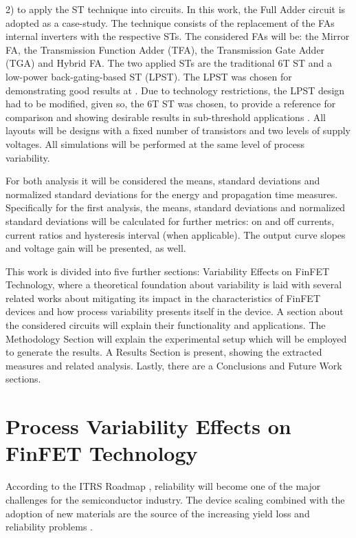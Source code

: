 \documentclass[pgmicro,diss,english]{iiufrgs}
\begin{document}
	2) to apply the ST technique into circuits. In this work, the Full Adder circuit is adopted as a case-study. The technique consists of the replacement of the FAs internal inverters with the respective STs. The considered FAs will be: the Mirror FA, the Transmission Function Adder (TFA), the Transmission Gate Adder (TGA) and Hybrid FA. The two applied STs are the traditional 6T ST and a low-power back-gating-based ST (LPST). The LPST was chosen for demonstrating good results at \cite{dokania2015circuit}. Due to technology restrictions, the LPST design had to be modified, given so, the 6T ST was chosen, to provide a reference for comparison and showing desirable results in sub-threshold applications \cite{lotze2017ultra}. All layouts will be designs with a fixed number of transistors and two levels of supply voltages. All simulations will be performed at the same level of process variability.

For both analysis it will be considered the means, standard deviations and normalized standard deviations for the energy and propagation time measures. Specifically for the first analysis, the means, standard deviations and normalized standard deviations will be calculated for further metrics: on and off currents, current ratios and hysteresis interval (when applicable). The output curve slopes and voltage gain will be presented, as well.

    This work is divided into five further sections: Variability Effects on FinFET Technology, where a theoretical foundation about variability is laid with several related works about mitigating its impact in the characteristics of FinFET devices and how process variability presents itself in the device. A section about the considered circuits will explain their functionality and applications. The Methodology Section will explain the experimental setup which will be employed to generate the results. A Results Section is present, showing the extracted measures and related analysis. Lastly, there are a Conclusions and Future Work sections.

\chapter{Process Variability Effects on FinFET Technology}

According to the ITRS Roadmap \cite{blish2003critical}, reliability will become one of the major challenges for the semiconductor industry. The device scaling combined with the adoption of new materials are the source of the increasing yield loss and reliability problems \cite{gielen2008emerging}.
\end{document}
